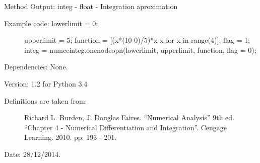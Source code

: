\documentclass[letterpaper,10pt,oneside]{sphinxmanual}
\theoremstyle{plain}%
\theoremstyle{definition}%
\theoremstyle{remark}%
\begin{document}
Method Output: integ - float - Integration aproximation
\begin{description}
\item[{Example code: lowerlimit = 0;}] \leavevmode
upperlimit = 5;
function = {[}(x*(10-0)/5)*x-x for x in range(4){]};
flag = 1;
integ = numecinteg.onenodeopn(lowerlimit, upperlimit, function, flag = 0);

\end{description}

Dependencies: None.

Version: 1.2 for Python 3.4
\begin{description}
\item[{Definitions are taken from:}] \leavevmode
Richard L. Burden, J. Douglas Faires. ``Numerical Analysis'' 9th ed.
``Chapter 4 - Numerical Differentiation and Integration''. 
Cengage Learning. 2010. pp: 193 - 201.

\end{description}

Date: 28/12/2014.
\end{document}
